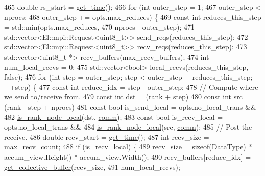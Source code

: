 \begin{DoxyCode}
465   \textcolor{keywordtype}{double} rs\_start = \hyperlink{namespacelbann_a478d36031ff0659893c4322cd856157f}{get\_time}();
466   \textcolor{keywordflow}{for} (\textcolor{keywordtype}{int} outer\_step = 1;
467        outer\_step < nprocs;
468        outer\_step += opts.max\_reduces) \{
469     \textcolor{keyword}{const} \textcolor{keywordtype}{int} reduces\_this\_step = std::min(opts.max\_reduces,
470                                            nprocs - outer\_step);
471     std::vector<El::mpi::Request<uint8\_t>> send\_reqs(reduces\_this\_step);
472     std::vector<El::mpi::Request<uint8\_t>> recv\_reqs(reduces\_this\_step);
473     std::vector<uint8\_t *> recv\_buffers(max\_recv\_buffers);
474     \textcolor{keywordtype}{int} num\_local\_recvs = 0;
475     std::vector<bool> local\_recvs(reduces\_this\_step, \textcolor{keyword}{false});
476     \textcolor{keywordflow}{for} (\textcolor{keywordtype}{int} step = outer\_step; step < outer\_step + reduces\_this\_step; ++step) \{
477       \textcolor{keyword}{const} \textcolor{keywordtype}{int} reduce\_idx = step - outer\_step;
478       \textcolor{comment}{// Compute where we send to/receive from.}
479       \textcolor{keyword}{const} \textcolor{keywordtype}{int} dst = (rank + step) %
480       \textcolor{keyword}{const} \textcolor{keywordtype}{int} src = (rank - step + nprocs) %
481       \textcolor{keyword}{const} \textcolor{keywordtype}{bool} is\_send\_local = opts.no\_local\_trans &&
482                                  \hyperlink{classlbann_1_1lbann__comm_a5cdd318d1505ba0f31bf4fe9fadffacc}{is\_rank\_node\_local}(dst, \hyperlink{file__io_8cpp_ab048c6f9fcbcfaa57ce68b00263dbebe}{comm});
483       \textcolor{keyword}{const} \textcolor{keywordtype}{bool} is\_recv\_local = opts.no\_local\_trans &&
484                                  \hyperlink{classlbann_1_1lbann__comm_a5cdd318d1505ba0f31bf4fe9fadffacc}{is\_rank\_node\_local}(src, \hyperlink{file__io_8cpp_ab048c6f9fcbcfaa57ce68b00263dbebe}{comm});
485       \textcolor{comment}{// Post the receive.}
486       \textcolor{keywordtype}{double} recv\_start = \hyperlink{namespacelbann_a478d36031ff0659893c4322cd856157f}{get\_time}();
487       \textcolor{keywordtype}{int} recv\_size = max\_recv\_count;
488       \textcolor{keywordflow}{if} (is\_recv\_local) \{
489         recv\_size = \textcolor{keyword}{sizeof}(DataType) * accum\_view.Height() * accum\_view.Width();
490         recv\_buffers[reduce\_idx] = \hyperlink{classlbann_1_1lbann__comm_ae925ac5eaf2895717c709b252961b3bf}{get\_collective\_buffer}(recv\_size,
491                                    num\_local\_recvs);

\end{DoxyCode}
